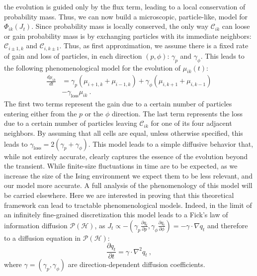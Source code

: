 \documentclass[draft,nofootinbib,pre,twocolumn,showpacs,showkeys,preprintnumbers,floatfix]{revtex4-1}
\newcommand{\CC}[2]{\mathcal{C}_{#1 #2}}
\newcommand{\1}{\mathbbm{1}}
\newcommand{\PH}{\mathcal{P}(\mathcal{H})}
\begin{document}
the evolution is guided only by the flux term, leading to a local conservation of probability
mass. Thus, we can now build a microscopic, particle-like, model for $\Phi_{ik}(J_t)$.
Since probability mass is locally conserved, the only way $\CC{i}{k}$ can loose or 
gain probability mass is by exchanging particles with its immediate neighbors: $\CC{i\pm1,}{k}$ and $\CC{i,}{k\pm1}$. 
Thus, as first approximation, we assume there is a fixed rate of gain and loss of particles,
in each direction $(p,\phi)$: $\gamma_p$ and $\gamma_{\phi}$. This leads to 
the following phenomenological model for the evolution of $\mu_{ik}(t)$:
\begin{align}
\frac{d\mu_{ik}}{dt} &= \gamma_p \left( \mu_{i+1,k} + \mu_{i-1,k}\right) +\gamma_{\phi} \left( \mu_{i,k+1} + \mu_{i,k-1}\right) \nonumber \\
&- \gamma_{\mathrm{loss}}\mu_{ik}~.
\end{align}
The first two terms represent the gain due to a certain number of particles entering 
either from the $p$ or the $\phi$ direction. The last term represents the loss
due to a certain number of particles leaving $\CC{i}{k}$ for one of its four adjacent neighbors.
By assuming that all cells are equal, unless otherwise specified, this leads to $\gamma_{\mathrm{loss}} = 2(\gamma_p+\gamma_{\phi})$.
This model leads to a simple diffusive behavior that, while not entirely accurate, 
clearly captures the essence of the evolution beyond the transient. While finite-size
fluctuations in time are to be expected, as we increase the size of the Ising environment
we expect them to be less relevant, and our model more accurate. A full analysis of 
the phenomenology of this model will be carried elsewhere. Here we are interested 
in proving that this theoretical framework can lead to tractable phenomenological 
models. Indeed, in the limit of an infinitely fine-grained discretization this model leads 
to a Fick's law of information diffusion $\PH$, as $J_t \propto - (\gamma_p \frac{\partial q_t}{\partial p},\gamma_\phi \frac{\partial q_t}{\partial \phi} ) = - \gamma \cdot \nabla q_t$
and therefore to a diffusion equation in $\PH$:
\begin{equation}
\frac{\partial q_t}{\partial t} =  \gamma \cdot \nabla^2 q_t~,
\end{equation}
where $\gamma = (\gamma_p,\gamma_\phi)$ are direction-dependent diffusion coefficients.
\end{document}
